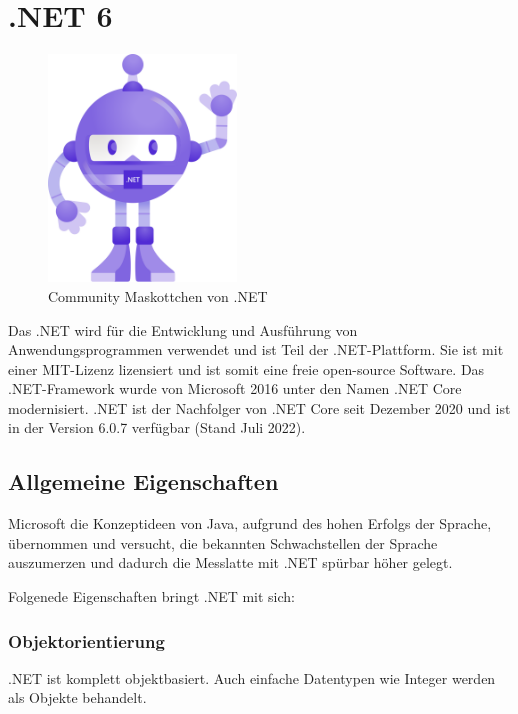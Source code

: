 \section{.NET 6}
\begin{figure}[h]
    \begin{center}
        \includegraphics*[width=5cm]{pics/Dotnet-bot.png}
        \caption[Community Maskottchen von .NET]{Community Maskottchen von .NET \cite{DotNetBot}}
    \end{center}
\end{figure}

\cite{CSharp8Rheinwerk}
\cite{DotNet6Documentation}
\cite{DotNet6Wikipedia}

Das .NET wird für die Entwicklung und Ausführung von Anwendungsprogrammen verwendet und ist Teil der .NET-Plattform.
Sie ist mit einer MIT-Lizenz lizensiert und ist somit eine freie open-source Software. Das .NET-Framework wurde von Microsoft 
2016 unter den Namen .NET Core modernisiert. .NET ist der Nachfolger von .NET Core seit Dezember 2020 und ist in der Version 6.0.7 verfügbar (Stand Juli 2022).

\subsection{Allgemeine Eigenschaften}
Microsoft die Konzeptideen von Java, aufgrund des hohen Erfolgs der Sprache,
übernommen und versucht, die bekannten Schwachstellen der Sprache auszumerzen und dadurch die Messlatte mit 
.NET spürbar höher gelegt.

Folgenede Eigenschaften bringt .NET mit sich:

\subsubsection{Objektorientierung}
.NET ist komplett objektbasiert. Auch einfache Datentypen wie Integer werden als Objekte behandelt.

